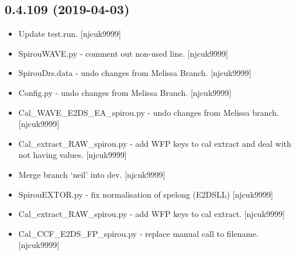 \documentclass[a4paper,10pt,english]{report}
\begin{document}
\subsection{0.4.109 (2019-04-03)}
\label{\detokenize{misc/changelog:id150}}\begin{itemize}
\item {} 
Update test.run. {[}njcuk9999{]}

\item {} 
SpirouWAVE.py - comment out non-used line. {[}njcuk9999{]}

\item {} 
SpirouDrs.data - undo changes from Melissa Branch. {[}njcuk9999{]}

\item {} 
Config.py - undo changes from Melissa Branch. {[}njcuk9999{]}

\item {} 
Cal\_WAVE\_E2DS\_EA\_spirou.py - undo changes from Melissa branch.
{[}njcuk9999{]}

\item {} 
Cal\_extract\_RAW\_spirou.py - add WFP keys to cal extract and deal with
not having values. {[}njcuk9999{]}

\item {} 
Merge branch ‘neil’ into dev. {[}njcuk9999{]}

\item {} 
SpirouEXTOR.py - fix normalisation of spelong (E2DSLL) {[}njcuk9999{]}

\item {} 
Cal\_extract\_RAW\_spirou.py - add WFP keys to cal extract. {[}njcuk9999{]}

\item {} 
Cal\_CCF\_E2DS\_FP\_spirou.py - replace manual call to filename.
{[}njcuk9999{]}

\end{itemize}
\end{document}
